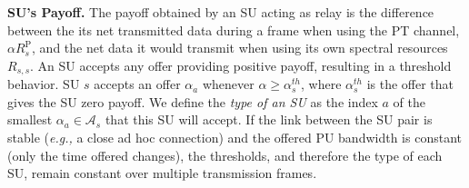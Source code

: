 \textbf{SU's Payoff.} The payoff obtained by an SU acting as relay is the difference between the its net transmitted data during a frame when using the PT channel, $\alpha R_{s}^{\text{P}}$, and the net data it would transmit when using its own spectral resources $R_{s,s}$. An SU accepts any offer providing positive payoff, resulting in a threshold behavior. SU $s$ accepts an offer $\alpha_a$ whenever $\alpha\geq \alpha_s^{th}$, where $\alpha_s^{th}$ is the offer that gives the SU zero payoff. We define the \textit{type of an SU} as the index $a$ of the smallest $\alpha_{a}\in\mathcal{A}_s$ that this SU will accept. 
If the link between the SU pair is stable (\textit{e.g.,} a close ad hoc connection) and the offered PU bandwidth is constant (only the time offered changes), the thresholds, and therefore the type of each SU, remain constant over multiple transmission frames.
